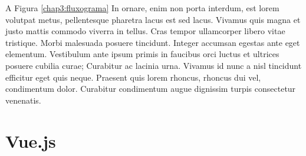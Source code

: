 \label{chap3:sec:fluxograma}

A Figura \ref{chap3:fluxograma} In ornare, enim non porta interdum, est lorem volutpat metus, pellentesque pharetra lacus est sed lacus. Vivamus quis magna et justo mattis commodo viverra in tellus. Cras tempor ullamcorper libero vitae tristique. Morbi malesuada posuere tincidunt. Integer accumsan egestas ante eget elementum. Vestibulum ante ipsum primis in faucibus orci luctus et ultrices posuere cubilia curae; Curabitur ac lacinia urna. Vivamus id nunc a nisl tincidunt efficitur eget quis neque. Praesent quis lorem rhoncus, rhoncus dui vel, condimentum dolor. Curabitur condimentum augue dignissim turpis consectetur venenatis.

\section{Vue.js}


